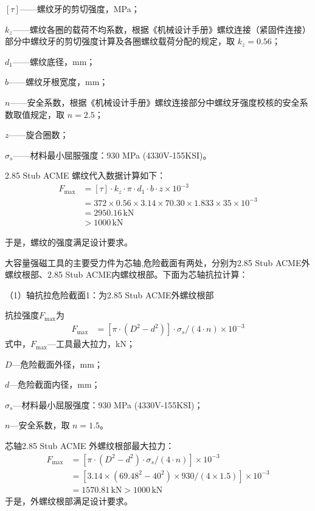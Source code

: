 $[\tau]$——螺纹牙的剪切强度，MPa；

$k_z$——螺纹各圈的载荷不均系数，根据《机械设计手册》螺纹连接（紧固件连接）部分中螺纹牙的剪切强度计算及各圈螺纹载荷分配的规定\cite{ref26}，取 $k_z = 0.56$；

$d_1$——螺纹底径，mm；

$b$——螺纹牙根宽度，mm；

$n$——安全系数，根据《机械设计手册》螺纹连接部分中螺纹牙强度校核的安全系数取值规定\cite{ref26}，取 $n = 2.5$；

$z$——旋合圈数；

$\sigma_s$——材料最小屈服强度：930 MPa (4330V-155KSI)。


2.85 Stub ACME 螺纹代入数据计算如下：
\begin{align}
    F_{\max} &= [\tau] \cdot k_z \cdot \pi \cdot d_1 \cdot b \cdot z \times 10^{-3} \\
             &= 372 \times 0.56 \times 3.14 \times 70.30 \times 1.833 \times 35 \times 10^{-3} \\
             &= 2950.16 \, \text{kN} \\
             &> 1000 \, \text{kN}
\end{align}

于是，螺纹的强度满足设计要求。

大容量强磁工具的主要受力件为芯轴,危险截面有两处，分别为2.85 Stub ACME外螺纹根部、2.85 Stub ACME内螺纹根部。下面为芯轴抗拉计算：

（1）轴抗拉危险截面1：为2.85 Stub ACME外螺纹根部

抗拉强度$F_{\max}$为
\begin{align}
    F_{\max} &= \left[\pi \cdot (D^2 - d^2)\right] \cdot \sigma_s / (4 \cdot n) \times 10^{-3}
\end{align}
式中，$F_{\max}$---工具最大拉力，kN；

$D$---危险截面外径，mm；

$d$---危险截面内径，mm；

$\sigma_s$---材料最小屈服强度：930 MPa (4330V-155KSI)；

$n$---安全系数，取 $n = 1.5$。

芯轴2.85 Stub ACME 外螺纹根部最大拉力：
\begin{align}
    F_{\max} &= \left[\pi \cdot (D^2 - d^2) \cdot \sigma_s / (4 \cdot n)\right] \times 10^{-3} \\
             &= \left[3.14 \times (69.48^2 - 40^2) \times 930 / (4 \times 1.5)\right] \times 10^{-3} \\
             &= 1570.81 \, \text{kN} > 1000 \, \text{kN}
\end{align}
于是，外螺纹根部满足设计要求。


